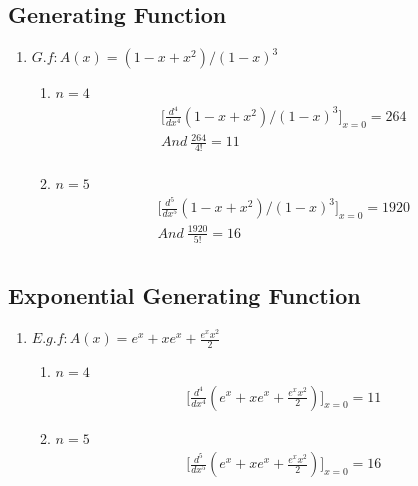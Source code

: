 \documentclass[a4paper,10pt]{article}
\begin{document}
\subsection{Generating Function}
\begin{enumerate}
\item $G.f : A(x) = (1-x+x^2)/(1-x)^3$
  \begin{enumerate}
    \item $n = 4$
    \[
     \boxed{ 
	  \begin{gathered}
    	{[}\frac{d^4 }{dx^4}(1-x+x^2)/(1-x)^3 {]}_{x=0} = 264  \\ 
    	And ~ \frac{264}{4!} = 11 \\
      \end{gathered}	    
	  }
    \]	  
    \item $ n = 5$
    \[
     \boxed{ 
	  \begin{gathered}
		{[}\frac{d^5 }{dx^5}(1-x+x^2)/(1-x)^3 {]}_{x=0} = 1920  \\ 
    	And ~ \frac{1920}{5!} = 16 \\
      \end{gathered}	    
	  }
    \]	
  \end{enumerate}
\end{enumerate}

\subsection{Exponential Generating Function}
\begin{enumerate}
\item $E.g.f: A(x) = e^x+xe^x+\frac{e^xx^2}{2}$
	\begin{enumerate}
		\item $n = 4$
		\[
		\boxed{
			\begin{gathered}
				{[}\frac{d^4}{dx^4}(e^x+xe^x+\frac{e^xx^2}{2}){]}_{x=0} = 11
			\end{gathered}
		}
		\]
		\item $ n = 5$
		\[
		\boxed{
			\begin{gathered}
				{[}\frac{d^5}{dx^5}(e^x+xe^x+\frac{e^xx^2}{2}){]}_{x=0} = 16
			\end{gathered}
		}
		\]
	\end{enumerate}
\end{enumerate}
\end{document}
